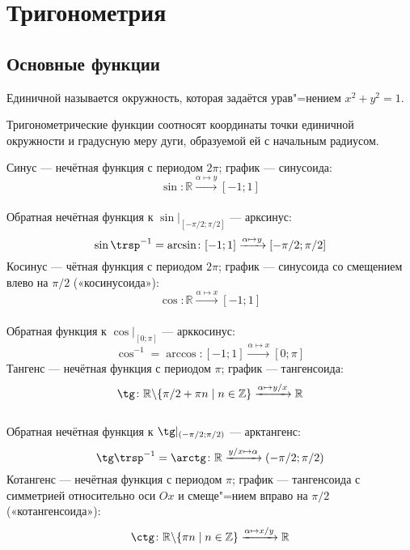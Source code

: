 \section{Тригонометрия}

\subsection{Основные функции}

{\bold Единичной} называется окружность, которая задаётся урав"=нением $x^2+y^2=1$.\par

Тригонометрические функции соотносят {\ital координаты} точки единичной окружности
и {\ital градусную меру дуги}, образуемой ей с начальным радиусом.\par

{\bold Синус} --- нечётная функция с периодом $2\pi$; график --- {\ital синусоида}:
\\[-13pt]
$$\sin\colon\mathbb{R}\xrightarrow{\alpha\mapsto y}[-1;1]$$\\[-1pt]

Обратная нечётная функция к $\sin\vert_{[-\pi/2;\pi/2]}$ --- {\bold арксинус}:
$$\sin\trsp^{-1}=\arcsin\colon[-1;1]\xrightarrow{\alpha\mapsto y}[-\pi/2;\pi/2]$$
{\bold Косинус} --- чётная функция с периодом $2\pi$; график --- {\ital синусоида}
со смещением влево на $\pi/2$ {\ital\color{desc} («косинусоида»)}:\\[-6pt]
$$\cos\colon\mathbb{R}\xrightarrow{\alpha\mapsto x}[-1;1]$$\\[-1pt]

Обратная функция к $\cos\vert_{[0;\pi]}$ --- {\bold арккосинус}:
$$\cos^{-1}=\arccos\colon[-1;1]\xrightarrow{\alpha\mapsto x}[0;\pi]$$
{\bold Тангенс} --- нечётная функция с периодом $\pi$; график --- {\ital тангенсоида}:
\\[-13pt]
$$\tg\colon\mathbb{R}\backslash\{\pi/2+\pi n\mid n\in\mathbb{Z}\}\xrightarrow
{\alpha\mapsto y/x}\mathbb{R}$$\\[-1pt]

Обратная нечётная функция к $\tg\vert_{(-\pi/2;\pi/2)}$ --- {\bold арктангенс}:
$$\tg\trsp^{-1}=\arctg\colon\mathbb{R}\xrightarrow{y/x\mapsto\alpha}(-\pi/2;\pi/2)$$
{\bold Котангенс} --- нечётная функция с периодом $\pi$; график --- {\ital тангенсоида}
с симметрией относительно оси $Ox$ и смеще"=нием вправо на $\pi/2$ {\ital\color{desc} 
(«котангенсоида»)}:\\[-7pt]
$$\ctg\colon\mathbb{R}\backslash\{\pi n\mid n\in\mathbb{Z}\}\xrightarrow{\alpha\mapsto
x/y}\mathbb{R}$$\\[-1pt]

